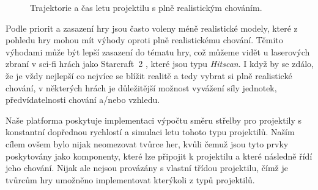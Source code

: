 \begin{figure}[h]
	\centering
	\def\svgwidth{0.7\textwidth}
	
	\caption{Trajektorie a čas letu projektilu s plně realistickým chováním.}
	\label{fig:withdragproj}
\end{figure}


Podle priorit a zasazení hry jsou často voleny méně realistické modely, které z pohledu hry mohou mít výhody oproti plně realistickému chování. Těmito výhodami může být lepší zasazení do tématu hry, což můžeme vidět u laserových zbraní v sci-fi hrách jako Starcraft~2 \citep{site:starcraft}, které jsou typu \textit{Hitscan}. I když by se zdálo, že je vždy nejlepší co nejvíce se blížit realitě a tedy vybrat si plně realistické chování, v některých hrách je důležitější možnost vyvážení síly jednotek, předvídatelnosti chování a/nebo vzhledu.  


Naše platforma poskytuje implementaci výpočtu směru střelby pro projektily s konstantní dopřednou rychlostí a simulaci letu tohoto typu projektilů. Naším cílem ovšem bylo nijak neomezovat tvůrce her, kvůli čemuž jsou tyto prvky poskytovány jako komponenty, které lze připojit k projektilu a které následně řídí jeho chování. Nijak ale nejsou provázány s vlastní třídou projektilu, čímž je tvůrcům hry umožněno implementovat kterýkoli z typů projektilů.


